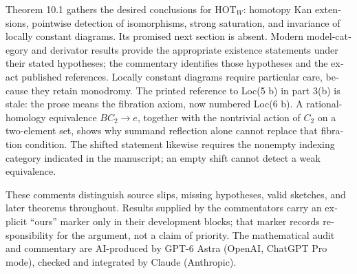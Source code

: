 \begin{otherlanguage}{english}
Theorem 10.1 gathers the desired conclusions for $\mathrm{HOT}_W$: homotopy Kan extensions, pointwise detection of isomorphisms, strong saturation, and invariance of locally constant diagrams. Its promised next section is absent. Modern model-category and derivator results provide the appropriate existence statements under their stated hypotheses; the commentary identifies those hypotheses and the exact published references. Locally constant diagrams require particular care, because they retain monodromy. The printed reference to Loc(5 b) in part 3(b) is stale: the prose means the fibration axiom, now numbered Loc(6 b). A rational-homology equivalence $BC_2\to e$, together with the nontrivial action of $C_2$ on a two-element set, shows why summand reflection alone cannot replace that fibration condition. The shifted statement likewise requires the nonempty indexing category indicated in the manuscript; an empty shift cannot detect a weak equivalence.

These comments distinguish source slips, missing hypotheses, valid sketches, and later theorems throughout. Results supplied by the commentators carry an explicit “ours” marker only in their development blocks; that marker records responsibility for the argument, not a claim of priority. The mathematical audit and commentary are AI-produced by GPT-6 Astra (OpenAI, ChatGPT Pro mode), checked and integrated by Claude (Anthropic).

\end{otherlanguage}
